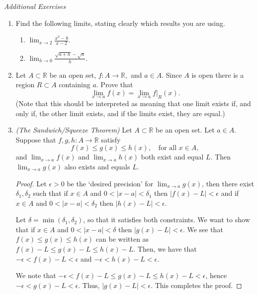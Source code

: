 \documentclass[11pt]{article}
\newcommand{\bbR}{\mathbb{R}}
\renewcommand{\_}[1]{\underline{ #1 }}
\theoremstyle{definition}
\numberwithin{equation}{subsection}
\begin{document}
\begin{center}
{\em Additional Exercises}
\end{center}

\begin{enumerate}

\item Find the following limits, stating clearly which results you are using.
\begin{enumerate}
\item[a)] $\displaystyle \lim_{x\to 2} \frac{x^3-8}{x-2}.$
\item[b)] $\displaystyle\lim_{h\to 0} \frac{\sqrt{a+h}-\sqrt{a}}{h}.$
\end{enumerate}



\item Let $A\subset \bbR$ be an open set, $f\colon A\to\bbR,$ and $a\in A.$ Since $A$ is open there is a region $R\subset A$ containing $a.$ Prove that 
$$\lim_{x\to a} f(x) = \lim_{x\to a} f|_R (x).$$
(Note that this should be interpreted as meaning that one limit exists if, and only if, the other limit exists, and if the limits exist, they are equal.) 


\item {\em (The Sandwich/Squeeze Theorem)} Let $A\subset \bbR$ be an open set. Let $a\in A.$ Suppose that $f,g,h\colon A\to \bbR$ satisfy
$$f(x)\leq g(x)\leq h(x),\quad \text{for all } x\in A,$$
and $\displaystyle \lim_{x\to a}f(x)$ and $\displaystyle \lim_{x\to a} h(x)$ both exist and equal $L.$ Then $\displaystyle \lim_{x\to a} g(x)$ also exists and equals $L.$


\begin{proof}
Let $\epsilon>0$ be the `desired precision' for $\lim_{x\to a} g(x)$, then there exist $\delta_1,\delta_2$ such that if $x\in A$ and $0<|x-a|<\delta_1$ then $|f(x)-L|<\epsilon$ and if $x\in A$ and $0<|x-a|<\delta_2$ then $|h(x)-L|<\epsilon$. 

Let $\delta = \min(\delta_1,\delta_2)$, so that it satisfies both constraints. We want to show that if $x\in A$ and $0<|x-a|<\delta$ then $|g(x)-L|<\epsilon$. We see that $f(x)\leq g(x)\leq h(x)$ can be written as $f(x)-L\leq g(x)-L\leq h(x)-L$. Then, we have that $-\epsilon<f(x)-L<\epsilon$ and $-\epsilon<h(x)-L<\epsilon$. 

We note that $-\epsilon<f(x)-L\leq g(x)-L\leq h(x)-L<\epsilon$, hence $-\epsilon<g(x)-L<\epsilon$. Thus, $|g(x)-L|<\epsilon$. This completes the proof.

\renewcommand\qedsymbol{QED}
\end{proof}




\end{enumerate}
\end{document}
